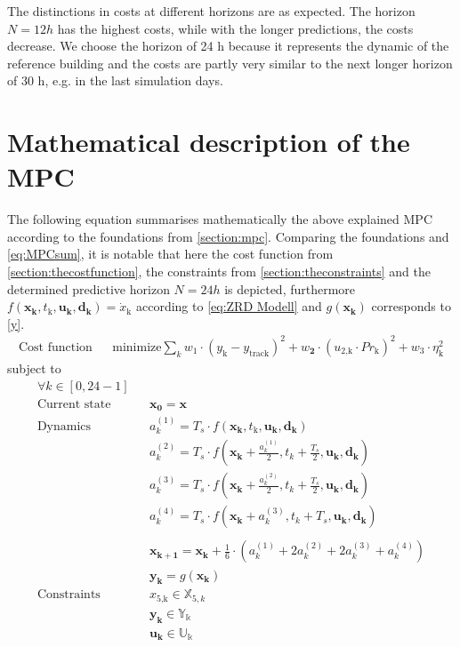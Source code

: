 The distinctions in costs at different horizons are as expected. The horizon $N = 12 h$ has the highest costs, while with the longer predictions, the costs decrease.\newline 
We choose the horizon of 24 h because it represents the dynamic of the reference building and the costs are partly very similar to the next longer horizon of 30 h, e.g. in the last simulation days.

\section{Mathematical description of the MPC}
\label{sec:mathematicalDescriptionMPC}
The following equation summarises mathematically the above explained MPC according to the foundations from \autoref{section:mpc}. Comparing the foundations and \autoref{eq:MPCsum}, it is notable that here the cost function from \autoref{section:thecostfunction}, the constraints from \autoref{section:theconstraints} and the determined predictive horizon $N = 24h$ is depicted, furthermore $f(\mathbf{x_k},t_\text{k},\mathbf{u_k},\mathbf{d_k}) = \dot{x}_\text{k}$ according to \autoref{eq:ZRD Modell} and $g(\mathbf{x_k})$ corresponds to \autoref{y}.  
\begin{align}
\label{eq:MPCsum}
\textrm{Cost function} && \text{minimize} \sum_{k} w_\text{1}\cdot (y_\text{k}-y_\text{track})^2 + w_\textbf{2}\cdot(u_\text{2,k}\cdot Pr_\text{k})^2 + w_\text{3} \cdot \eta_\text{k}^2
\end{align}
subject to 
\begin{align*}
\forall k \in [0,24-1]\\
\textrm{Current state} && \mathbf{x_0} = \mathbf{x} \\	
\textrm{Dynamics} && a_k^{(1)} = T_s \cdot f(\mathbf{x_k},t_\text{k},\mathbf{u_k},\mathbf{d_k}) \\
        && a_k^{(2)} = T_s \cdot f(\mathbf{x_k}+\frac{a_k^{(1)}}{2},t_k+\frac{T_s}{2},\mathbf{u_k},\mathbf{d_k})\\
        && a_k^{(3)} = T_s \cdot f(\mathbf{x_k}+\frac{a_k^{(2)}}{2},t_k+\frac{T_s}{2},\mathbf{u_k},\mathbf{d_k})\\
        && a_k^{(4)} = T_s \cdot f(\mathbf{x_k}+a_k^{(3)},t_k+T_s,\mathbf{u_k},\mathbf{d_k})\\
        \\
        && \mathbf{x_{k+1}} = \mathbf{x_k} + \frac{1}{6}\cdot (a_k^{(1)} + 2 a_k^{(2)} + 2 a_k^{(3)} + a_k^{(4)})\\
&&	\mathbf{y_k} = g(\mathbf{x_k})\\				
\textrm{Constraints} && x_\text{5,k} \in \mathbb{X}_{5,k} \\		
 && \mathbf{y_k} \in \mathbb{Y_k}\\
 && \mathbf{u_k} \in \mathbb{U_k}\\
\end{align*}
